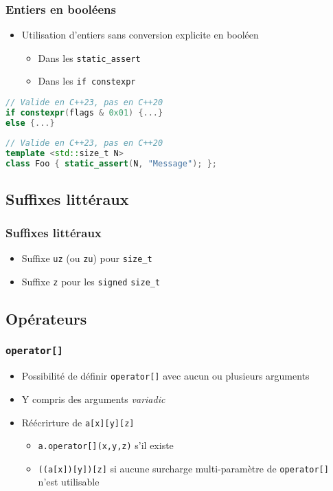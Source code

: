 \documentclass[C++.tex]{subfiles}
\begin{document}
\begin{frame}[fragile]
	\frametitle{Entiers en booléens}
	\begin{itemize}
		\item Utilisation d'entiers sans conversion explicite en booléen
		\begin{itemize}
			\item Dans les \lstinline|static_assert|
			\item Dans les \lstinline|if constexpr|
		\end{itemize}
	\end{itemize}

	\begin{lstlisting}[language=C++]
// Valide en C++23, pas en C++20
if constexpr(flags & 0x01) {...}
else {...}\end{lstlisting}

	\begin{lstlisting}[language=C++]
// Valide en C++23, pas en C++20
template <std::size_t N>
class Foo {	static_assert(N, "Message"); };\end{lstlisting}
\end{frame}

\subsection*{Suffixes littéraux}
\begin{frame}[fragile]
	\frametitle{Suffixes littéraux}
	\begin{itemize}
		\item Suffixe \lstinline|uz| (ou \lstinline|zu|) pour \lstinline|size_t|
		\item Suffixe \lstinline|z| pour les \og \lstinline|signed|\fg{} \lstinline|size_t|

	\end{itemize}
\end{frame}

\subsection*{Opérateurs}
\begin{frame}[fragile]
	\frametitle{\lstinline|operator[]|}
	\begin{itemize}
		\item Possibilité de définir \lstinline|operator[]| avec aucun ou plusieurs arguments
		\item Y compris des arguments \textit{variadic}
		\item Réécrirture de \lstinline|a[x][y][z]|
		\begin{itemize}
			\item \lstinline|a.operator[](x,y,z)| s'il existe
			\item \lstinline|((a[x])[y])[z]| si aucune surcharge multi-paramètre de \lstinline|operator[]| n'est utilisable
		\end{itemize}
	\end{itemize}

\end{frame}
\end{document}
